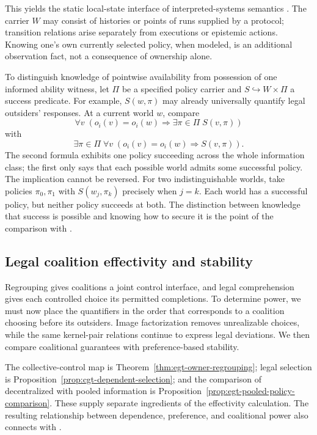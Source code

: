 \documentclass[11pt,a4paper]{article}
\numberwithin{equation}{section}
\theoremstyle{definition}
\theoremstyle{remark}
\theoremstyle{plain}
\begin{document}
This yields the static local-state interface of interpreted-systems
semantics \citep{HalpernFagin1989KnowledgeAction}. The carrier $W$
may consist of histories or points of runs supplied by a protocol;
transition relations arise separately from executions or epistemic actions.
Knowing one's own currently selected policy, when modeled, is an
additional observation fact, not a consequence of ownership alone.

To distinguish knowledge of pointwise availability from possession
of one informed ability witness, let $\Pi$ be a specified policy
carrier and $S\hookrightarrow W\times\Pi$ a success predicate.
For example, $S(w,\pi)$ may already universally quantify legal
outsiders' responses. At a current world $w$, compare
\[
 \forall v\;(o_i(v)=o_i(w)\Rightarrow
                    \exists\pi\in\Pi\;S(v,\pi))
\]
with
\[
 \exists\pi\in\Pi\;\forall v\;(o_i(v)=o_i(w)\Rightarrow S(v,\pi)).
\]
The second formula exhibits one policy succeeding across the whole
information class; the first only says that each possible world admits
some successful policy. The implication cannot be reversed. For two
indistinguishable worlds, take policies $\pi_0,\pi_1$ with
$S(w_j,\pi_k)$ precisely when $j=k$. Each world has a successful
policy, but neither policy succeeds at both. The distinction between
knowledge that success is possible and knowing how to secure it is the
point of the comparison with \citet{JamrogaVanDerHoek2004KnowHow}.

\subsection{Legal coalition effectivity and stability}
\label{sec:egt-coalitions}

Regrouping gives coalitions a joint control interface, and legal
comprehension gives each controlled choice its permitted completions.
To determine power, we must now place the quantifiers in the order that
corresponds to a coalition choosing before its outsiders. Image
factorization removes unrealizable choices, while the same kernel-pair
relations continue to express legal deviations. We then compare
coalitional guarantees with preference-based stability.

The collective-control map is Theorem~\ref{thm:egt-owner-regrouping};
legal selection is Proposition~\ref{prop:cgt-dependent-selection}; and
the comparison of decentralized with pooled information is
Proposition~\ref{prop:egt-pooled-policy-comparison}. These supply
separate ingredients of the effectivity calculation. The resulting
relationship between dependence, preference, and coalitional power also
connects with \citet{ChenShiWang2022}.
\end{document}
